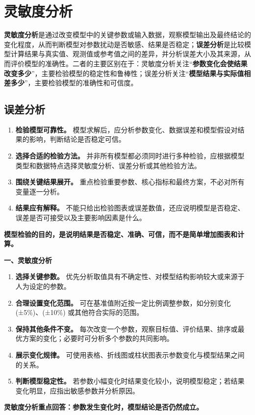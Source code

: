 \section{灵敏度分析}

\textbf{灵敏度分析}是通过改变模型中的关键参数或输入数据，观察模型输出及最终结论的变化程度，从而判断模型对参数扰动是否敏感、结果是否稳定；\textbf{误差分析}是比较模型计算结果与真实值、观测值或参考值之间的差异，并分析误差大小及其来源，从而评价模型的准确性。二者的主要区别在于：灵敏度分析关注“\textbf{参数变化会使结果改变多少}”，主要检验模型的稳定性和鲁棒性；误差分析关注“\textbf{模型结果与实际值相差多少}”，主要检验模型的准确性和可信度。

\subsection{误差分析}
\begin{enumerate}[label=(\arabic*), leftmargin=2.5em, itemsep=0.3em]
\item \textbf{检验模型可靠性。} 模型求解后，应分析参数变化、数据误差和模型假设对结果的影响，判断结论是否稳定可信。

\item \textbf{选择合适的检验方法。} 并非所有模型都必须同时进行多种检验，应根据模型类型和数据特点选择灵敏度分析、误差分析或其他检验方法。

\item \textbf{围绕关键结果展开。} 重点检验重要参数、核心指标和最终方案，不必对所有变量逐一分析。

\item \textbf{结果应有解释。} 不能只给出检验图表或误差数值，还应说明模型是否稳定、误差是否可接受以及主要影响因素是什么。
\end{enumerate}
\hspace*{\parindent} \textbf{模型检验的目的，是说明结果是否稳定、准确、可信，而不是简单增加图表和计算。}

\textbf{一、灵敏度分析}
\begin{enumerate}[label=(\arabic*), leftmargin=2.5em, itemsep=0.3em]
\item \textbf{选择关键参数。} 优先分析取值具有不确定性、对模型结构影响较大或来源于人为设定的参数。

\item \textbf{合理设置变化范围。} 可在基准值附近按一定比例调整参数，如分别变化 (±5\%)、(±10\%) 或其他符合实际的范围。

\item \textbf{保持其他条件不变。} 每次改变一个参数，观察目标值、评价结果、排序或最优方案的变化；必要时可分析多个参数的共同影响。

\item \textbf{展示变化规律。} 可使用表格、折线图或柱状图表示参数变化与模型结果之间的关系。

\item \textbf{判断模型稳定性。} 若参数小幅变化时结果变化较小，说明模型稳定；若结果变化明显，应指出敏感参数并分析原因。
\end{enumerate}
\hspace*{\parindent} \textbf{灵敏度分析重点回答：参数发生变化时，模型结论是否仍然成立。}

